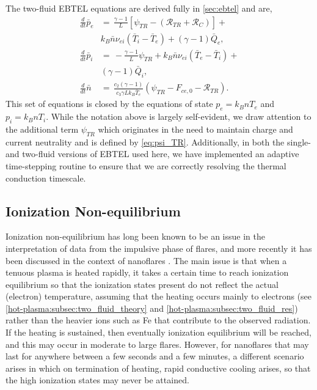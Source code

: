 The two-fluid EBTEL equations are derived fully in \autoref{sec:ebtel} and are,
\begin{align}
    \frac{d}{dt}\bar{p}_e &=\,\frac{\gamma - 1}{L}[\psi_{TR} - (\mathcal{R}_{TR} + \mathcal{R}_C)] + \nonumber \\ & k_B\bar{n}\nu_{ei}(\bar{T}_i-\bar{T}_e) + (\gamma-1)\bar{Q}_{e},\label{eq:press_e_0d_2fl} \\[0.5em]
    \frac{d}{dt}\bar{p}_i &=\,-\frac{\gamma - 1}{L}\psi_{TR} + k_B\bar{n}\nu_{ei}(\bar{T}_e-\bar{T}_i) + \nonumber \\ &(\gamma-1)\bar{Q}_{i},\label{eq:press_i_0d_2fl} \\[0.5em]
    \frac{d}{dt}\bar{n} &=\,\frac{c_2(\gamma-1)}{c_3\gamma Lk_B\bar{T}_e}(\psi_{TR} - F_{ce,0}-\mathcal{R}_{TR}).	\label{eq:mass_0d_2fl}
\end{align}
This set of equations is closed by the equations of state $p_e=k_BnT_e$ and $p_i=k_BnT_i$. While the notation above is largely self-evident, we draw attention to the additional term $\psi_{TR}$ which originates in the need to maintain charge and current neutrality and is defined by \autoref{eq:psi_TR}. Additionally, in both the single- and two-fluid versions of EBTEL used here, we have implemented an adaptive time-stepping routine to ensure that we are correctly resolving the thermal conduction timescale.

\subsection{Ionization Non-equilibrium}\label{hot-plasma:subsec:nei_theory}

Ionization non-equilibrium has long been known to be an issue in the interpretation of data from the impulsive phase of flares, and more recently it has been discussed in the context of nanoflares \citep{bradshaw_explosive_2006,reale_nonequilibrium_2008}. The main issue is that when a tenuous plasma is heated rapidly, it takes a certain time to reach ionization equilibrium so that the ionization states present do not reflect the actual (electron) temperature, assuming that the heating occurs mainly to electrons (see \autoref{hot-plasma:subsec:two_fluid_theory} and \autoref{hot-plasma:subsec:two_fluid_res}) rather than the heavier ions such as Fe that contribute to the observed radiation. If the heating is sustained, then eventually ionization equilibrium will be reached, and this may occur in moderate to large flares. However, for nanoflares that may last for anywhere between a few seconds and a few minutes, a different scenario arises in which on termination of heating, rapid conductive cooling arises, so that the high ionization states may never be attained.

